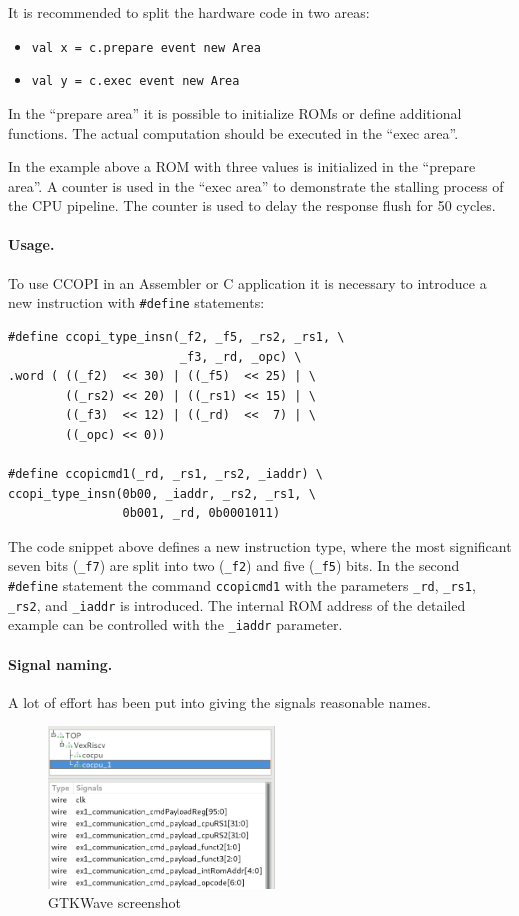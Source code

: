 \documentclass[twoside,twocolumn]{article}
\newcommand{\code}[1]{\texttt{#1}}
\begin{document}
It is recommended to split the hardware code in two areas:
\begin{itemize}
    \item \code{val x = c.prepare event new Area }
    \item \code{val y = c.exec event new Area }
\end{itemize}
In the ``prepare area'' it is possible to initialize ROMs or define
additional functions. The actual computation should be executed in the 
``exec area''.

In the example above a ROM with three values is initialized in the
``prepare area''. A counter is used in the ``exec area'' to demonstrate
the stalling process of the CPU pipeline. The counter is used to delay the
response flush for 50 cycles.
\paragraph{Usage.}
To use  CCOPI in an Assembler or C application it is necessary to
introduce a new instruction with \code{\#define} statements:

\begin{lstlisting}
#define ccopi_type_insn(_f2, _f5, _rs2, _rs1, \
                        _f3, _rd, _opc) \
.word ( ((_f2)  << 30) | ((_f5)  << 25) | \
        ((_rs2) << 20) | ((_rs1) << 15) | \ 
        ((_f3)  << 12) | ((_rd)  <<  7) | \ 
        ((_opc) << 0))

#define ccopicmd1(_rd, _rs1, _rs2, _iaddr) \
ccopi_type_insn(0b00, _iaddr, _rs2, _rs1, \
                0b001, _rd, 0b0001011)
\end{lstlisting}
The code snippet above defines a new instruction type, where the
most significant seven bits (\code{\_f7}) are split into two 
(\code{\_f2}) and five (\code{\_f5}) bits. In the second \code{\#define}
statement the command \code{ccopicmd1} with the parameters \code{\_rd},
\code{\_rs1}, \code{\_rs2}, and \code{\_iaddr} is introduced.
The internal ROM address of the detailed example can be controlled 
with the \code{\_iaddr} parameter.

\paragraph{Signal naming.} 
A lot of effort has been put into giving the signals reasonable names.
\begin{figure}[h]
    \centering
    \includegraphics[width=6cm]{includes/gtkwave.png}
    \caption{GTKWave screenshot}
    \label{fig:gtkwave}
\end{figure}
\end{document}

